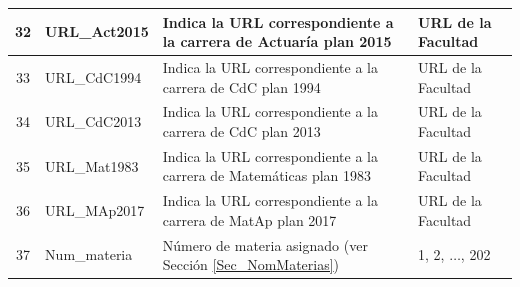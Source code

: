 {\begin{longtable}{|c|l|p{7cm}|p{2.6cm}|}
32 & URL\_Act2015 & Indica la URL correspondiente a la carrera de Actuaría plan 2015 & URL de la Facultad \\ 
\hline 
33 & URL\_CdC1994 & Indica la URL correspondiente a la carrera de CdC plan 1994 & URL de la Facultad \\ 
\hline 
34 & URL\_CdC2013 & Indica la URL correspondiente a la carrera de CdC plan 2013 & URL de la Facultad \\ 
\hline 
35 & URL\_Mat1983 & Indica la URL correspondiente a la carrera de Matemáticas plan 1983 & URL de la Facultad \\ 
\hline 
36 & URL\_MAp2017 & Indica la URL correspondiente a la carrera de MatAp plan 2017 & URL de la Facultad \\ 
\hline 
37 & Num\_materia & Número de materia asignado (ver Sección \ref{Sec_NomMaterias}) & 1, 2, $\ldots$, 202 \\ 
\hline 
\end{longtable}}


